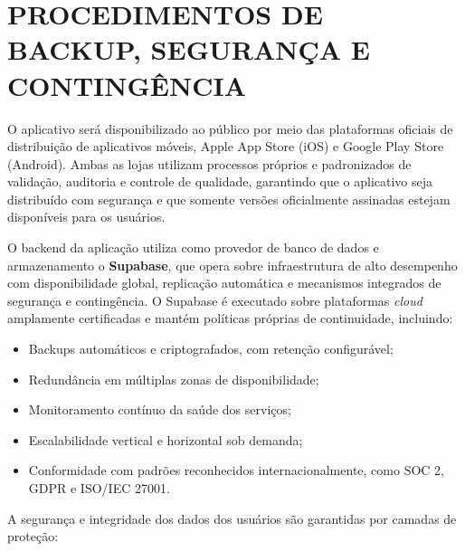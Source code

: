 
\section{PROCEDIMENTOS DE BACKUP, SEGURANÇA E CONTINGÊNCIA}

O aplicativo será disponibilizado ao público por meio das plataformas oficiais de
distribuição de aplicativos móveis, Apple App Store (iOS) e Google Play Store
(Android). Ambas as lojas utilizam processos próprios e padronizados de validação,
auditoria e controle de qualidade, garantindo que o aplicativo seja distribuído com
segurança e que somente versões oficialmente assinadas estejam disponíveis para
os usuários.

O backend da aplicação utiliza como provedor de banco de dados e armazenamento
o \textbf{Supabase}, que opera sobre infraestrutura de alto desempenho com
disponibilidade global, replicação automática e mecanismos integrados de segurança
e contingência. O Supabase é executado sobre plataformas \textit{cloud}
amplamente certificadas e mantém políticas próprias de continuidade, incluindo:

\begin{itemize}
  \item Backups automáticos e criptografados, com retenção configurável;
  \item Redundância em múltiplas zonas de disponibilidade;
  \item Monitoramento contínuo da saúde dos serviços;
  \item Escalabilidade vertical e horizontal sob demanda;
  \item Conformidade com padrões reconhecidos internacionalmente, como SOC 2,
        GDPR e ISO/IEC 27001.
\end{itemize}

A segurança e integridade dos dados dos usuários são garantidas por camadas de
proteção:

